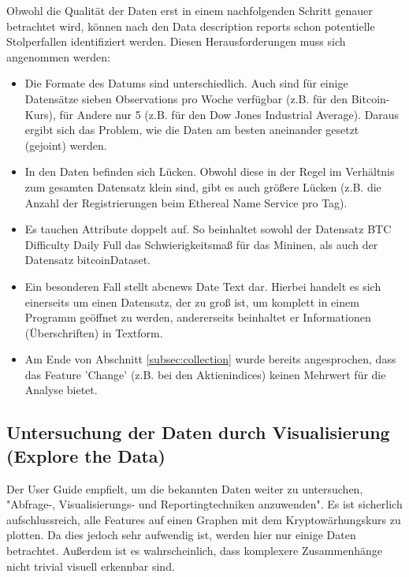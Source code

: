 Obwohl die Qualität der Daten erst in einem nachfolgenden Schritt genauer betrachtet wird, können nach den Data description reports schon potentielle Stolperfallen  identifiziert werden. Diesen Herausforderungen muss sich angenommen werden:
\begin{itemize}
\item Die Formate des Datums sind unterschiedlich. Auch sind für einige Datensätze sieben Observations pro Woche verfügbar (z.B. für den Bitcoin-Kurs), für Andere nur 5 (z.B. für den Dow Jones Industrial Average). Daraus ergibt sich das Problem, wie die Daten am besten aneinander gesetzt (gejoint) werden.
\item In den Daten befinden sich Lücken. Obwohl diese in der Regel im Verhältnis zum gesamten Datensatz klein sind, gibt es auch größere Lücken (z.B. die Anzahl der Registrierungen beim Ethereal Name Service pro Tag).
\item Es tauchen Attribute doppelt auf. So beinhaltet sowohl der Datensatz BTC \textunderscore Difficulty \textunderscore Daily \textunderscore Full das Schwierigkeitsmaß für das Mininen, als auch der Datensatz bitcoinDataset. 
\item Ein besonderen Fall stellt abcnews \textunderscore Date \textunderscore Text dar. Hierbei handelt es sich einerseits um einen Datensatz, der zu groß ist, um komplett in einem Programm geöffnet zu werden, andererseits beinhaltet er Informationen (Überschriften) in Textform.
\item Am Ende von Abschnitt \ref{subsec:collection} wurde bereits angesprochen, dass das Feature 'Change' (z.B. bei den Aktienindices) keinen Mehrwert für die Analyse bietet.
\end{itemize}

\subsection*{Untersuchung der Daten durch Visualisierung (Explore the Data)} \label{subsec:explore}
Der User Guide empfielt, um die bekannten Daten weiter zu untersuchen, "Abfrage-, Visualisierungs- und Reportingtechniken anzuwenden"\citep[S.~40; eigene Übersetzung]{chapman_crisp-dm_2000}. Es ist sicherlich aufschlussreich, alle Features auf einen Graphen mit dem Kryptowärhungskurs zu plotten. Da dies jedoch sehr aufwendig ist, werden hier nur einige Daten betrachtet. Außerdem ist es wahrscheinlich, dass komplexere Zusammenhänge nicht trivial visuell erkennbar sind.\newline


